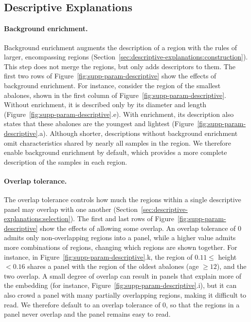 \documentclass[10pt]{article}
\begin{document}
\clearpage
\subsection{Descriptive Explanations}
\paragraph{Background enrichment.}
Background enrichment augments the description of a region with the rules of larger, encompassing regions (Section~\ref{sec:descriptive-explanations:construction}). This step does not merge the regions, but only adds descriptors to them.
The first two rows of Figure~\ref{fig:supp-param-descriptive} show the effects of background enrichment.
For instance, consider the region of the smallest abalones, shown in the first column of Figure~\ref{fig:supp-param-descriptive}.
Without enrichment, it is described only by its diameter and length (Figure~\ref{fig:supp-param-descriptive}.e).
With enrichment, its description also states that these abalones are the youngest and lightest (Figure~\ref{fig:supp-param-descriptive}.a).
Although shorter, descriptions without background enrichment omit characteristics shared by nearly all samples in the region.
We therefore enable background enrichment by default, which provides a more complete description of the samples in each region.

\paragraph{Overlap tolerance.}
The overlap tolerance controls how much the regions within a single descriptive panel may overlap with one another (Section~\ref{sec:descriptive-explanations:selection}).
The first and last rows of Figure~\ref{fig:supp-param-descriptive} show the effects of allowing some overlap.
An overlap tolerance of 0 admits only non-overlapping regions into a panel, while a higher value admits more combinations of regions, changing which regions are shown together.
For instance, in Figure~\ref{fig:supp-param-descriptive}.k, the region of $0.11 \leq$ height $< 0.16$ shares a panel with the region of the oldest abalones (age $\geq 12$), and the two overlap.
A small degree of overlap can result in panels that explain more of the embedding (for instance, Figure~\ref{fig:supp-param-descriptive}.i), but it can also crowd a panel with many partially overlapping regions, making it difficult to read.
We therefore default to an overlap tolerance of 0, so that the regions in a panel never overlap and the panel remains easy to read.
\end{document}
